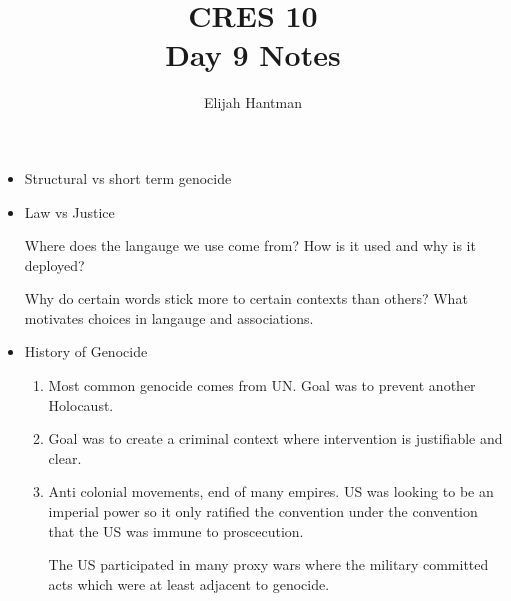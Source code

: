 \documentclass{report}
\title{\Huge{CRES 10}\\Day 9 Notes}
\author{\huge{Elijah Hantman}}
\date{}
\begin{document}
\maketitle
\newpage

\begin{itemize}
    \item Structural vs short term genocide
    \item Law vs Justice
        \begin{mdframed}
            Where does the langauge we use
            come from? How is it used and
            why is it deployed?

            Why do certain words stick more to
            certain contexts than others? What
            motivates choices in langauge and
            associations.
        \end{mdframed}
    \item History of Genocide
        \begin{enumerate}
            \item Most common genocide comes from
                UN. Goal was to prevent another
                Holocaust.
            \item Goal was to create a criminal
                context where intervention is
                justifiable and clear.
                \begin{center}
                \end{center}
            \item Anti colonial movements, end of many
                empires. US was looking to be an
                imperial power so it only ratified
                the convention under the convention
                that the US was immune to proscecution.

                \begin{mdframed}
                    The US participated in many
                    proxy wars where the military
                    committed acts which were at least
                    adjacent to genocide.


\end{mdframed}
\end{enumerate}
\end{itemize}
\end{document}
